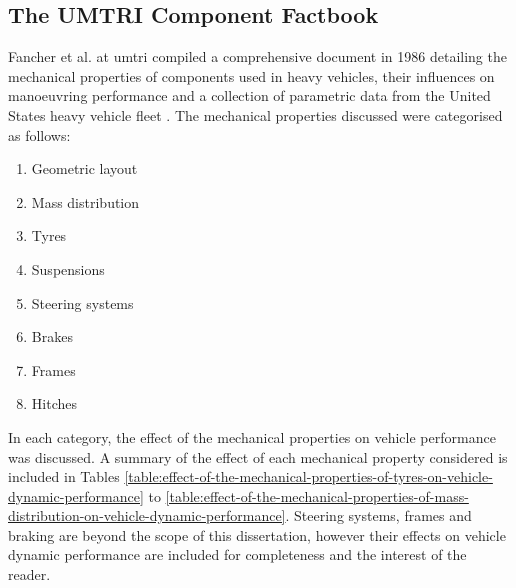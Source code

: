 \subsection{The UMTRI Component Factbook}\label{section:umtri-component-factbook}

Fancher et al. at \gls{umtri} compiled a comprehensive document in 1986 detailing the mechanical properties of components used in heavy vehicles, their influences on manoeuvring performance and a collection of parametric data from the United States heavy vehicle fleet \cite{Fancher1986}. The mechanical properties discussed were categorised as follows:

\begin{enumerate}
    \item Geometric layout
    \item Mass distribution
    \item Tyres
    \item Suspensions
    \item Steering systems
    \item Brakes
    \item Frames
    \item Hitches
\end{enumerate}

In each category, the effect of the mechanical properties on vehicle performance was discussed. A summary of the effect of each mechanical property considered is included in Tables \ref{table:effect-of-the-mechanical-properties-of-tyres-on-vehicle-dynamic-performance} to \ref{table:effect-of-the-mechanical-properties-of-mass-distribution-on-vehicle-dynamic-performance}. Steering systems, frames and braking are beyond the scope of this dissertation, however their effects on vehicle dynamic performance are included for completeness and the interest of the reader.

